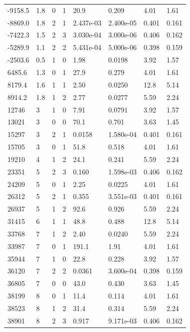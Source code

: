 \documentclass[preview]{standalone}
\begin{document}
{{\begin{tabular}{L{1.2cm}C{1.2cm} C{0.3cm}C{0.5cm} C{1.4cm}C{1.4cm} C{1.4cm}C{1.4cm}}
  -9158.5  &   1.8  & 0     &  1 &  20.9  & 0.209  & 4.01 &  1.61   \\ 
  -8869.0  &   1.8  & 2     &  1 &  2.437e-03  & 2.400e-05  & 0.401 &  0.161   \\ 
  -7422.3  &   1.5  & 2     &  3 &  3.030e-04  & 3.000e-06  & 0.406 &  0.162   \\ 
  -5289.9  &   1.1  & 2     &  2 &  5.431e-04  & 5.000e-06  & 0.398 &  0.159   \\ 
  -2503.6  &   0.5  & 1     &  0 &  1.98  & 0.0198  & 3.92 &  1.57   \\ 
  6485.6  &   1.3  & 0     &  1 &  27.9  & 0.279  & 4.01 &  1.61   \\ 
  8179.4  &   1.6  & 1     &  1 &  2.50  & 0.0250  & 12.8 &  5.14   \\ 
  8914.2  &   1.8  & 1     &  2 &  2.77  & 0.0277  & 5.59 &  2.24   \\ 
  12746  &     3  & 1     &  0 &  7.91  & 0.0791  & 3.92 &  1.57   \\ 
  13021  &     3  & 0     &  0 &  70.1  & 0.701  & 3.63 &  1.45   \\ 
  15297  &     3  & 2     &  1 &  0.0158  & 1.580e-04  & 0.401 &  0.161   \\ 
  15705  &     3  & 0     &  1 &  51.8  & 0.518  & 4.01 &  1.61   \\ 
  19210  &     4  & 1     &  2 &  24.1  & 0.241  & 5.59 &  2.24   \\ 
  23351  &     5  & 2     &  3 &  0.160  & 1.598e-03  & 0.406 &  0.162   \\ 
  24209  &     5  & 0     &  1 &  2.25  & 0.0225  & 4.01 &  1.61   \\ 
  26312  &     5  & 2     &  1 &  0.355  & 3.551e-03  & 0.401 &  0.161   \\ 
  26937  &     5  & 1     &  2 &  92.6  & 0.926  & 5.59 &  2.24   \\ 
  31415  &     6  & 1     &  1 &  48.8  & 0.488  & 12.8 &  5.14   \\ 
  33768  &     7  & 1     &  2 &  2.40  & 0.0240  & 5.59 &  2.24   \\ 
  33987  &     7  & 0     &  1 &  191.1  & 1.91  & 4.01 &  1.61   \\ 
  35944  &     7  & 1     &  0 &  22.8  & 0.228  & 3.92 &  1.57   \\ 
  36120  &     7  & 2     &  2 &  0.0361  & 3.600e-04  & 0.398 &  0.159   \\ 
  36805  &     7  & 0     &  0 &  43.0  & 0.430  & 3.63 &  1.45   \\ 
  38199  &     8  & 0     &  1 &  11.4  & 0.114  & 4.01 &  1.61   \\ 
  38523  &     8  & 1     &  2 &  31.4  & 0.314  & 5.59 &  2.24   \\ 
  38901  &     8  & 2     &  3 &  0.917  & 9.171e-03  & 0.406 &  0.162   \\ 
\hline 
\end{tabular} 

}}
\end{document}
